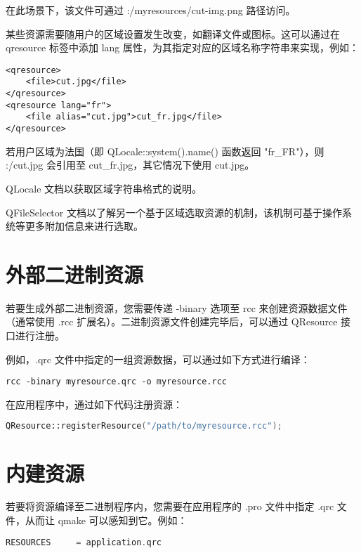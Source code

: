 在此场景下，该文件可通过 :/myresources/cut-img.png 路径访问。

某些资源需要随用户的区域设置发生改变，如翻译文件或图标。这可以通过在 qresource 标签中添加 lang 属性，为其指定对应的区域名称字符串来实现，例如：

\begin{lstlisting}
<qresource>
    <file>cut.jpg</file>
</qresource>
<qresource lang="fr">
    <file alias="cut.jpg">cut_fr.jpg</file>
</qresource>
\end{lstlisting}

若用户区域为法国（即 QLocale::system().name() 函数返回 "fr\_FR"），则 :/cut.jpg 会引用至 cut\_fr.jpg，其它情况下使用 cut.jpg。

\begin{seeAlso}
QLocale 文档以获取区域字符串格式的说明。
\end{seeAlso}

\begin{seeAlso}
QFileSelector 文档以了解另一个基于区域选取资源的机制，该机制可基于操作系统等更多附加信息来进行选取。
\end{seeAlso}

\section{外部二进制资源}

若要生成外部二进制资源，您需要传递 -binary 选项至 rcc 来创建资源数据文件（通常使用 .rcc 扩展名）。二进制资源文件创建完毕后，可以通过 QResource 接口进行注册。

例如，.qrc 文件中指定的一组资源数据，可以通过如下方式进行编译：

\begin{lstlisting}
rcc -binary myresource.qrc -o myresource.rcc
\end{lstlisting}

在应用程序中，通过如下代码注册资源：

\begin{lstlisting}[language=C++]
QResource::registerResource("/path/to/myresource.rcc");
\end{lstlisting}

\section{内建资源}

若要将资源编译至二进制程序内，您需要在应用程序的 .pro 文件中指定 .qrc 文件，从而让 qmake 可以感知到它。例如：

\begin{lstlisting}[language=C++]
RESOURCES     = application.qrc
\end{lstlisting}

